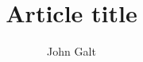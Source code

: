 \documentclass[sigconf]{acmart}
\title{Article title}
\author{John Galt}
\affiliation{%
  \institution{Institution}
  \city{City}
  \country{Country}
}
\begin{document}
\maketitle

\cite{author1984}



\end{document}
